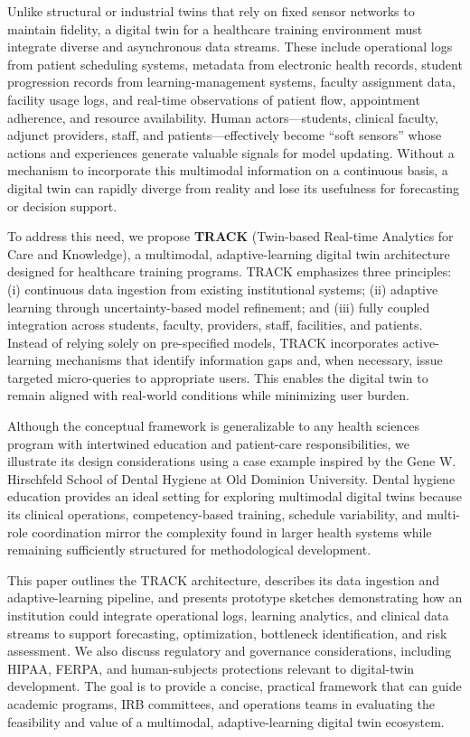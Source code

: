 \documentclass[Afour,sageh,times]{sagej}
\begin{document}
Unlike structural or industrial twins that rely on fixed sensor networks to maintain fidelity, a digital twin for a healthcare training environment must integrate diverse and asynchronous data streams. These include operational logs from patient scheduling systems, metadata from electronic health records, student progression records from learning-management systems, faculty assignment data, facility usage logs, and real-time observations of patient flow, appointment adherence, and resource availability. Human actors—students, clinical faculty, adjunct providers, staff, and patients—effectively become “soft sensors” whose actions and experiences generate valuable signals for model updating. Without a mechanism to incorporate this multimodal information on a continuous basis, a digital twin can rapidly diverge from reality and lose its usefulness for forecasting or decision support.

To address this need, we propose \textbf{TRACK} (Twin-based Real-time Analytics for Care and Knowledge), a multimodal, adaptive-learning digital twin architecture designed for healthcare training programs. TRACK emphasizes three principles: (i) continuous data ingestion from existing institutional systems; (ii) adaptive learning through uncertainty-based model refinement; and (iii) fully coupled integration across students, faculty, providers, staff, facilities, and patients. Instead of relying solely on pre-specified models, TRACK incorporates active-learning mechanisms that identify information gaps and, when necessary, issue targeted micro-queries to appropriate users. This enables the digital twin to remain aligned with real-world conditions while minimizing user burden.

Although the conceptual framework is generalizable to any health sciences program with intertwined education and patient-care responsibilities, we illustrate its design considerations using a case example inspired by the Gene W. Hirschfeld School of Dental Hygiene at Old Dominion University. Dental hygiene education provides an ideal setting for exploring multimodal digital twins because its clinical operations, competency-based training, schedule variability, and multi-role coordination mirror the complexity found in larger health systems while remaining sufficiently structured for methodological development.

This paper outlines the TRACK architecture, describes its data ingestion and adaptive-learning pipeline, and presents prototype sketches demonstrating how an institution could integrate operational logs, learning analytics, and clinical data streams to support forecasting, optimization, bottleneck identification, and risk assessment. We also discuss regulatory and governance considerations, including HIPAA, FERPA, and human-subjects protections relevant to digital-twin development. The goal is to provide a concise, practical framework that can guide academic programs, IRB committees, and operations teams in evaluating the feasibility and value of a multimodal, adaptive-learning digital twin ecosystem.
\end{document}
